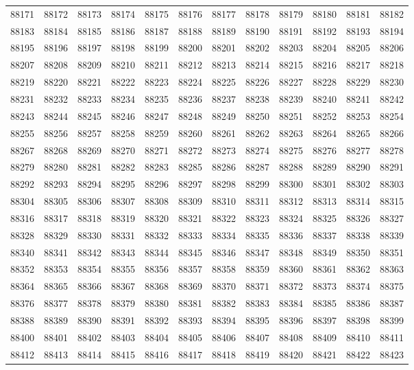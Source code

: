 \begin{center}
\begin{longtable}{llllllllllll}
88171 &88172 &88173 &88174 &88175 &88176 &88177 &88178 &88179 &88180 &88181 &88182 \\
88183 &88184 &88185 &88186 &88187 &88188 &88189 &88190 &88191 &88192 &88193 &88194 \\
88195 &88196 &88197 &88198 &88199 &88200 &88201 &88202 &88203 &88204 &88205 &88206 \\
88207 &88208 &88209 &88210 &88211 &88212 &88213 &88214 &88215 &88216 &88217 &88218 \\
88219 &88220 &88221 &88222 &88223 &88224 &88225 &88226 &88227 &88228 &88229 &88230 \\
88231 &88232 &88233 &88234 &88235 &88236 &88237 &88238 &88239 &88240 &88241 &88242 \\
88243 &88244 &88245 &88246 &88247 &88248 &88249 &88250 &88251 &88252 &88253 &88254 \\
88255 &88256 &88257 &88258 &88259 &88260 &88261 &88262 &88263 &88264 &88265 &88266 \\
88267 &88268 &88269 &88270 &88271 &88272 &88273 &88274 &88275 &88276 &88277 &88278 \\
88279 &88280 &88281 &88282 &88283 &88285 &88286 &88287 &88288 &88289 &88290 &88291 \\
88292 &88293 &88294 &88295 &88296 &88297 &88298 &88299 &88300 &88301 &88302 &88303 \\
88304 &88305 &88306 &88307 &88308 &88309 &88310 &88311 &88312 &88313 &88314 &88315 \\
88316 &88317 &88318 &88319 &88320 &88321 &88322 &88323 &88324 &88325 &88326 &88327 \\
88328 &88329 &88330 &88331 &88332 &88333 &88334 &88335 &88336 &88337 &88338 &88339 \\
88340 &88341 &88342 &88343 &88344 &88345 &88346 &88347 &88348 &88349 &88350 &88351 \\
88352 &88353 &88354 &88355 &88356 &88357 &88358 &88359 &88360 &88361 &88362 &88363 \\
88364 &88365 &88366 &88367 &88368 &88369 &88370 &88371 &88372 &88373 &88374 &88375 \\
88376 &88377 &88378 &88379 &88380 &88381 &88382 &88383 &88384 &88385 &88386 &88387 \\
88388 &88389 &88390 &88391 &88392 &88393 &88394 &88395 &88396 &88397 &88398 &88399 \\
88400 &88401 &88402 &88403 &88404 &88405 &88406 &88407 &88408 &88409 &88410 &88411 \\
88412 &88413 &88414 &88415 &88416 &88417 &88418 &88419 &88420 &88421 &88422 &88423 \\

\end{longtable}
\end{center}
